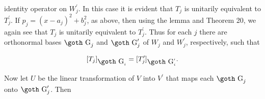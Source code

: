 identity operator on \(W^{\prime}_{j}\). In this case it is evident that \(T_{j}\) is unitarily equivalent to \(T^{\prime}_{j}\). If \(p_{j}=(x-a_{j})^{2}+b_{j}^{2}\), as above, then using the lemma and Theorem 20, we again see that \(T_{j}\) is unitarily equivalent to \(T^{\prime}_{j}\). Thus for each \(j\) there are orthonormal bases \(\hbox{\goth G}_{j}\) and \(\hbox{\goth G}^{\prime}_{j}\) of \(W_{j}\) and \(W^{\prime}_{j}\), respectively, such that

\[[T_{j}]_{\hbox{\goth G}_{i}}=[T^{\prime}_{j}]_{\hbox{\goth G}_{i}^{\prime}}.\]

Now let \(U\) be the linear transformation of \(V\) into \(V^{\prime}\) that maps each \(\hbox{\goth G}_{j}\) onto \(\hbox{\goth G}^{\prime}_{j}\). Then \ 